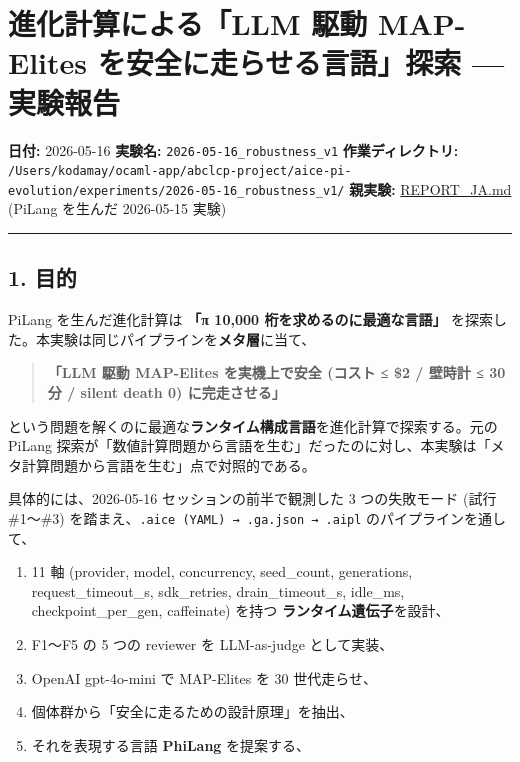 \documentclass[
]{ltjsarticle}
\author{}
\date{}
\providecommand{\tightlist}{%
  \setlength{\itemsep}{0pt}\setlength{\parskip}{0pt}}
\begin{document}
{
\setcounter{tocdepth}{2}
\tableofcontents
}
\section{進化計算による「LLM 駆動 MAP-Elites を安全に走らせる言語」探索
---
実験報告}\label{ux9032ux5316ux8a08ux7b97ux306bux3088ux308bllm-ux99c6ux52d5-map-elites-ux3092ux5b89ux5168ux306bux8d70ux3089ux305bux308bux8a00ux8a9eux63a2ux7d22-ux5b9fux9a13ux5831ux544a}

\textbf{日付:} 2026-05-16 \textbf{実験名:}
\texttt{2026-05-16\_robustness\_v1} \textbf{作業ディレクトリ:}
\texttt{/Users/kodamay/ocaml-app/abclcp-project/aice-pi-evolution/experiments/2026-05-16\_robustness\_v1/}
\textbf{親実験:} \href{../../REPORT_JA.md}{REPORT\_JA.md} (PiLang
を生んだ 2026-05-15 実験)

\begin{center}\rule{0.5\linewidth}{0.5pt}\end{center}

\subsection{1. 目的}\label{ux76eeux7684}

PiLang を生んだ進化計算は \textbf{「π 10,000 桁を求めるのに最適な言語」}
を探索した。本実験は同じパイプラインを\textbf{メタ層}に当て、

\begin{quote}
\textbf{「LLM 駆動 MAP-Elites を実機上で安全 (コスト ≤ \$2 / 壁時計 ≤ 30
分 / silent death 0) に完走させる」}
\end{quote}

という問題を解くのに最適な\textbf{ランタイム構成言語}を進化計算で探索する。元の
PiLang
探索が「数値計算問題から言語を生む」だったのに対し、本実験は「メタ計算問題から言語を生む」点で対照的である。

具体的には、2026-05-16 セッションの前半で観測した 3 つの失敗モード (試行
\#1〜\#3) を踏まえ、\texttt{.aice\ (YAML)\ →\ .ga.json\ →\ .aipl}
のパイプラインを通して、

\begin{enumerate}
\def\labelenumi{\arabic{enumi}.}
\tightlist
\item
  11 軸 (provider, model, concurrency, seed\_count, generations,
  request\_timeout\_s, sdk\_retries, drain\_timeout\_s, idle\_ms,
  checkpoint\_per\_gen, caffeinate) を持つ
  \textbf{ランタイム遺伝子}を設計、
\item
  F1〜F5 の 5 つの reviewer を LLM-as-judge として実装、
\item
  OpenAI gpt-4o-mini で MAP-Elites を 30 世代走らせ、
\item
  個体群から「安全に走るための設計原理」を抽出、
\item
  それを表現する言語 \textbf{PhiLang} を提案する、
\end{enumerate}
\end{document}
